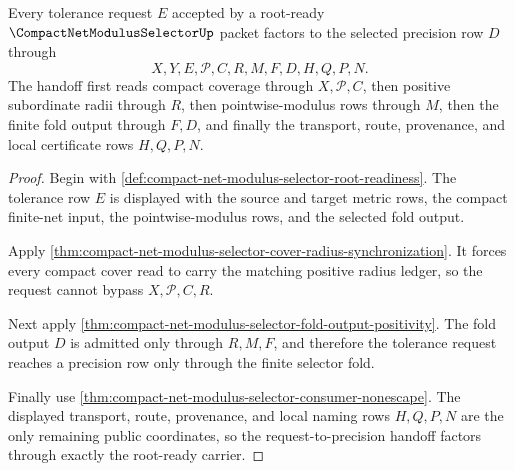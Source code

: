\begin{theorem}
\label{thm:compact-net-modulus-selector-request-to-precision-factorization}
Every tolerance request $E$ accepted by a root-ready $\CompactNetModulusSelectorUp$ packet factors to the selected precision row $D$ through
$$
X,Y,E,\mathcal{P},C,R,M,F,D,H,Q,P,N.
$$
The handoff first reads compact coverage through $X,\mathcal{P},C$, then positive subordinate radii through $R$, then pointwise-modulus rows through $M$, then the finite fold output through $F,D$, and finally the transport, route, provenance, and local certificate rows $H,Q,P,N$.
\end{theorem}
\begin{proof}
Begin with \autoref{def:compact-net-modulus-selector-root-readiness}. The tolerance row $E$ is displayed with the source and target metric rows, the compact finite-net input, the pointwise-modulus rows, and the selected fold output.

Apply \autoref{thm:compact-net-modulus-selector-cover-radius-synchronization}. It forces every compact cover read to carry the matching positive radius ledger, so the request cannot bypass $X,\mathcal{P},C,R$.

Next apply \autoref{thm:compact-net-modulus-selector-fold-output-positivity}. The fold output $D$ is admitted only through $R,M,F$, and therefore the tolerance request reaches a precision row only through the finite selector fold.

Finally use \autoref{thm:compact-net-modulus-selector-consumer-nonescape}. The displayed transport, route, provenance, and local naming rows $H,Q,P,N$ are the only remaining public coordinates, so the request-to-precision handoff factors through exactly the root-ready carrier.
\end{proof}

